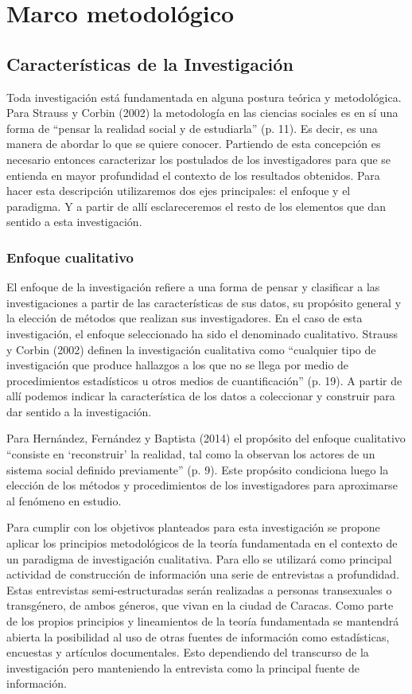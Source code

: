 \chapter{Marco metodológico}

\section{Características de la Investigación}

Toda investigación está fundamentada en alguna postura teórica y metodológica.
Para Strauss y Corbin (2002) la metodología en las ciencias sociales es en sí
una forma de “pensar la realidad social y de estudiarla” (p. 11).
Es decir, es una manera de abordar lo que se quiere conocer.
Partiendo de esta concepción es necesario entonces caracterizar los postulados
de los investigadores para que se entienda en mayor profundidad el contexto de
los resultados obtenidos.
Para hacer esta descripción utilizaremos dos ejes principales: el enfoque y el
paradigma.
Y a partir de allí esclareceremos el resto de los elementos que dan sentido a
esta investigación.

\subsection{Enfoque cualitativo}

El enfoque de la investigación refiere a una forma de pensar y clasificar a las
investigaciones a partir de las características de sus datos, su propósito
general y la elección de métodos que realizan sus investigadores.
En el caso de esta investigación, el enfoque seleccionado ha sido el denominado
cualitativo.
Strauss y Corbin (2002) definen la investigación cualitativa como “cualquier
tipo de investigación que produce hallazgos a los que no se llega por medio de
procedimientos estadísticos u otros medios de cuantificación” (p. 19).
A partir de allí podemos indicar la característica de los datos a coleccionar y
construir para dar sentido a la investigación.

Para Hernández, Fernández y Baptista (2014) el propósito del enfoque cualitativo
“consiste en ‘reconstruir’ la realidad, tal como la observan los actores de un
sistema social definido previamente” (p. 9).
Este propósito condiciona luego la elección de los métodos y procedimientos de
los investigadores para aproximarse al fenómeno en estudio.

Para cumplir con los objetivos planteados para
esta investigación se propone aplicar los principios metodológicos de la teoría
fundamentada en el contexto de un paradigma de investigación cualitativa. Para ello se utilizará como
principal actividad de construcción de información una serie de entrevistas a
profundidad. Estas entrevistas semi-estructuradas serán realizadas a personas
transexuales o transgénero, de ambos géneros, que vivan en la ciudad de
Caracas. Como parte de los propios principios y lineamientos de la teoría
fundamentada se mantendrá abierta la posibilidad al uso de otras fuentes de
información como estadísticas, encuestas y artículos documentales. Esto
dependiendo del transcurso de la investigación pero manteniendo la entrevista
como la principal fuente de información.

